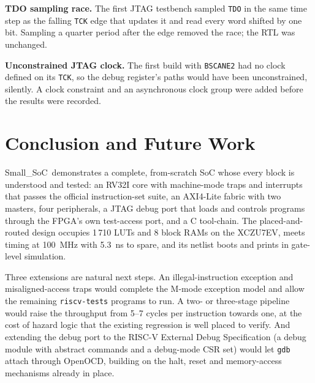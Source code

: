 \documentclass[journal,10pt]{IEEEtran}
\newcommand{\soc}{Small\_SoC}
\newcommand{\reg}[1]{\texttt{#1}}
\begin{document}
\textbf{TDO sampling race.} The first JTAG testbench sampled \reg{TDO} in the
same time step as the falling \reg{TCK} edge that updates it and read every
word shifted by one bit. Sampling a quarter period after the edge removed the
race; the RTL was unchanged.

\textbf{Unconstrained JTAG clock.} The first build with \reg{BSCANE2} had no
clock defined on its \reg{TCK}, so the debug register's paths would have
been unconstrained, silently. A clock constraint and an asynchronous clock
group were added before the results were recorded.

\section{Conclusion and Future Work}\label{sec:conclusion}
\soc\ demonstrates a complete, from-scratch SoC whose every block is
understood and tested: an RV32I core with machine-mode traps and interrupts
that passes the official instruction-set suite, an AXI4-Lite fabric with two
masters, four peripherals, a JTAG debug port that loads and controls
programs through the FPGA's own test-access port, and a C tool-chain. The
placed-and-routed design occupies 1\,710 LUTs and 8 block RAMs on the
XCZU7EV, meets timing at 100~MHz with 5.3~ns to spare, and its netlist boots
and prints in gate-level simulation.

Three extensions are natural next steps. An illegal-instruction exception
and misaligned-access traps would complete the M-mode exception model and
allow the remaining \reg{riscv-tests} programs to run. A two- or three-stage
pipeline would raise the throughput from 5--7 cycles per instruction towards
one, at the cost of hazard logic that the existing regression is well placed
to verify. And extending the debug port to the RISC-V External Debug
Specification (a debug module with abstract commands and a debug-mode CSR
set) would let \reg{gdb} attach through OpenOCD, building on the halt, reset
and memory-access mechanisms already in place.
\end{document}
